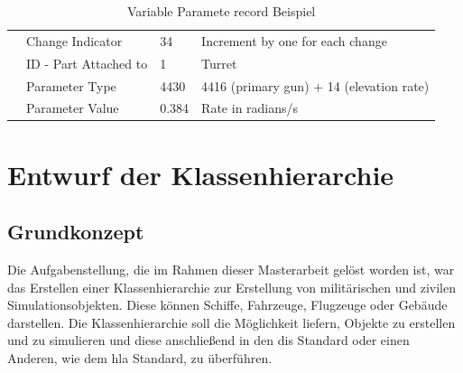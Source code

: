 \begin{table}[H]
{\begin{tabular}{|l|l|l|l|}
			& Change Indicator      & 34             & Increment by one for each change         \\ \cline{2-4} 
			& ID - Part Attached to & 1              & Turret                             \\ \cline{2-4} 
			& Parameter Type        & 4430           & 4416 (primary gun) + 14 (elevation rate) \\ \cline{2-4} 
			& Parameter Value       &0.384         & Rate in radians/s                        \\ \hline
	\end{tabular}}
	\caption[Variable Parameter record Beispiel ]{Variable Paramete record Beispiel\cite{SISOStandardsActivityCommitteeoftheIEEEComputerSociety.}}
	\label{variableex}
\end{table}


\chapter{Entwurf der Klassenhierarchie }


\section{Grundkonzept}
Die Aufgabenstellung, die im Rahmen dieser Masterarbeit gelöst worden ist, war das Erstellen einer Klassenhierarchie zur Erstellung von militärischen und zivilen Simulationsobjekten. Diese können Schiffe, Fahrzeuge, Flugzeuge oder Gebäude darstellen. Die Klassenhierarchie soll die Möglichkeit liefern, Objekte zu erstellen und zu simulieren und  diese anschließend in  den \ac{dis} Standard oder einen Anderen,  wie dem \ac{hla} Standard, zu überführen.   
 
